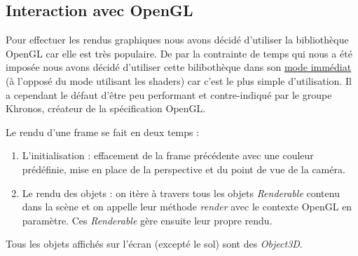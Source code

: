 \documentclass[11pt]{report}
\begin{document}
\subsection{Interaction avec OpenGL}

Pour effectuer les rendus graphiques nous avons décidé d'utiliser la bibliothèque OpenGL car elle est très populaire. De par la contrainte de temps qui nous a été imposée nous avons décidé d'utiliser cette bilibothèque dans son \href{https://stackoverflow.com/a/6734071/15223555}{\color{blue}mode immédiat} (à l'opposé du mode utilisant les shaders) car c'est le plus simple d'utilisation. Il a cependant le défaut d'être peu performant et contre-indiqué par le groupe Khronos, créateur de la spécification OpenGL.


Le rendu d'une frame se fait en deux temps :

\begin{enumerate}
  \item L'initialisation : effacement de la frame précédente avec une couleur prédéfinie, mise en place de la perspective et du point de vue de la caméra.
  \item Le rendu des objets : on itère à travers tous les objets \textit{Renderable} contenu dans la scène et on appelle leur méthode \textit{render} avec le contexte OpenGL en paramètre. Ces \textit{Renderable} gère ensuite leur propre rendu.
\end{enumerate}

Tous les objets affichés sur l'écran (excepté le sol) sont des \textit{Object3D}.
\end{document}

